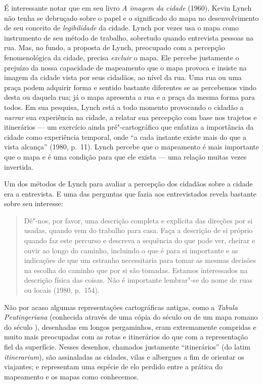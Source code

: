 É interessante notar que em seu livro \emph{A imagem da cidade} (1960),
Kevin Lynch não tenha se debruçado sobre o papel e o significado do mapa
no desenvolvimento de seu conceito de \emph{legibilidade} da cidade.
Lynch por vezes usa o mapa como instrumento de seu método de trabalho,
sobretudo quando entrevista pessoas na rua. Mas, no fundo, a proposta de
Lynch, preocupado com a percepção fenomenológica da cidade, precisa
\emph{excluir} o mapa. Ele percebe justamente o prejuízo da nossa
capacidade de mapeamento que o mapa provoca e insiste na imagem da
cidade vista por seus cidadãos, ao nível da rua. Uma rua ou uma praça
podem adquirir forma e sentido bastante diferentes se as percebemos
vindo desta ou daquela rua; já o mapa apresenta a rua e a praça da mesma
forma para todos. Em sua pesquisa, Lynch está a todo momento provocando
o cidadão a \emph{narrar} sua experiência na cidade, a relatar sua
percepção com base nos trajetos e itinerários --- um exercício ainda
pré"-cartográfico que enfatiza a importância da cidade como experiência
temporal, onde ``a cada instante existe mais do que a vista alcança''
(1980, p.~11). Lynch percebe que o mapeamento é mais importante que o
mapa e é uma condição para que ele exista --- uma relação muitas vezes
invertida.

Um dos
métodos de Lynch para avaliar a percepção dos cidadãos sobre a cidade
era a entrevista. E uma das perguntas que fazia aos entrevistados revela
bastante sobre seu interesse:

\begin{quote}
Dê"-nos, por favor, uma descrição completa e explícita das direções por
si usadas, quando vem do trabalho para casa. Faça a descrição de si
próprio quando faz este percurso e descreva a sequência do que pode ver,
cheirar e ouvir ao longo do caminho, incluindo o que é para si
importante e as indicações de que um estranho necessitaria para tomar as
mesmas decisões na escolha do caminho que por si são tomadas. Estamos
interessados na descrição física das coisas. Não é importante lembrar"-se
do nome de ruas ou locais (1980, p.~154).
\end{quote}

Não por acaso algumas representações cartográficas antigas, como a
\emph{Tabula Peutingeriana} (conhecida através de uma cópia do século
 ou  de um mapa romano do século ), desenhadas em longos
pergaminhos, eram extremamente compridas e muito mais preocupadas com as
rotas e itinerários do que com a representação fiel da superfície.
Nesses desenhos, chamados justamente ``itinerários'' (do
latim \emph{itinerarium}), são assinaladas as cidades, vilas e albergues
a fim de orientar os viajantes; e representam uma espécie de elo perdido
entre a prática do mapeamento e os mapas como conhecemos.

